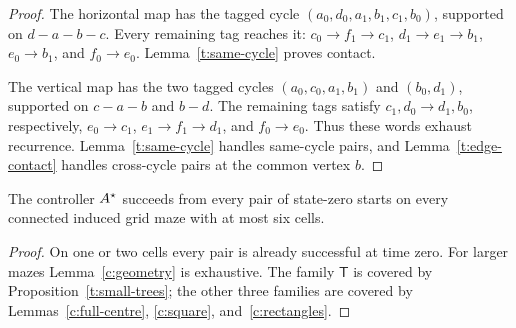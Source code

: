 \begin{proof}
The horizontal map has the tagged cycle
\((a_0,d_0,a_1,b_1,c_1,b_0)\), supported on \(d-a-b-c\).
Every remaining tag reaches it: \(c_0\to f_1\to c_1\),
\(d_1\to e_1\to b_1\), \(e_0\to b_1\), and
\(f_0\to e_0\). Lemma~\ref{t:same-cycle} proves contact.

The vertical map has the two tagged cycles
\((a_0,c_0,a_1,b_1)\) and \((b_0,d_1)\), supported on \(c-a-b\)
and \(b-d\). The remaining tags satisfy
\(c_1,d_0\to d_1,b_0\), respectively,
\(e_0\to c_1\), \(e_1\to f_1\to d_1\), and \(f_0\to e_0\).
Thus these words exhaust recurrence. Lemma~\ref{t:same-cycle} handles
same-cycle pairs, and Lemma~\ref{t:edge-contact} handles cross-cycle pairs
at the common vertex \(b\).
\end{proof}

\begin{proposition}\label{c:six-cell}
The controller \(A^{\star}\) succeeds from every pair of state-zero starts
on every connected induced grid maze with at most six cells.
\end{proposition}
\begin{proof}
On one or two cells every pair is already successful at time zero.
For larger mazes Lemma~\ref{c:geometry} is exhaustive.
The family \(\mathsf T\) is covered by Proposition~\ref{t:small-trees};
the other three families are covered by Lemmas~\ref{c:full-centre},
\ref{c:square}, and~\ref{c:rectangles}.
\end{proof}
